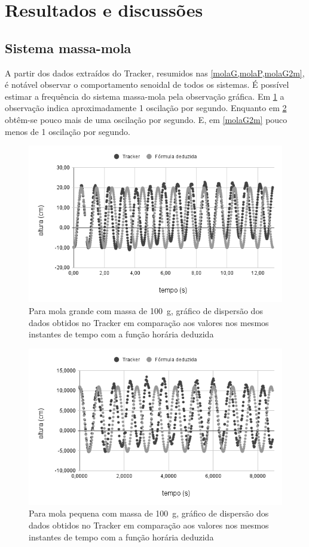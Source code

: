 \section{Resultados e discussões}
\subsection{Sistema massa-mola}
A partir dos dados extraídos do Tracker, resumidos nas \cref{molaG,molaP,molaG2m}, é notável observar o comportamento senoidal de todos os sistemas. É possível estimar a frequência do sistema massa-mola pela observação gráfica. Em \cref{molaG} a observação indica aproximadamente 1 oscilação por segundo. Enquanto em \cref{molaP} obtêm-se pouco mais de uma oscilação por segundo. E, em \cref{molaG2m} pouco menos de 1 oscilação por segundo.

\begin{figure}[h]
    \centering
    \includegraphics[width=.5\linewidth]{fig/molaG}
    \caption{Para mola grande com massa de \qty{100}{g}, gráfico de dispersão dos dados obtidos no Tracker em comparação aos valores nos mesmos instantes de tempo com a função horária deduzida}\label{molaG}
\end{figure}

\begin{figure}[h]
    \centering
    \includegraphics[width=.5\linewidth]{fig/molaP}
    \caption{Para mola pequena com massa de \qty{100}{g}, gráfico de dispersão dos dados obtidos no Tracker em comparação aos valores nos mesmos instantes de tempo com a função horária deduzida}\label{molaP}
\end{figure}
 

